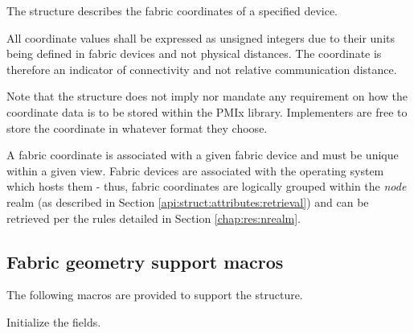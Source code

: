 The  structure describes the fabric coordinates of a specified device.


All coordinate values shall be expressed as unsigned integers due to their units being defined in fabric devices and not physical distances. The coordinate is therefore an indicator of connectivity and not relative communication distance.

\adviceimplstart
Note that the  structure does not imply nor mandate any requirement on how the coordinate data is to be stored within the \ac{PMIx} library. Implementers are free to store the coordinate in whatever format they choose.
\adviceimplend

A fabric coordinate is associated with a given fabric device and must be unique within a given view. Fabric devices are associated with the operating system which hosts them - thus, fabric coordinates are logically grouped within the \emph{node} realm (as described in Section \ref{api:struct:attributes:retrieval}) and can be retrieved per the rules detailed in Section \ref{chap:res:nrealm}.


\subsection{Fabric geometry support macros}
\label{api:netgeom:macros}

The following macros are provided to support the  structure.


Initialize the  fields.

